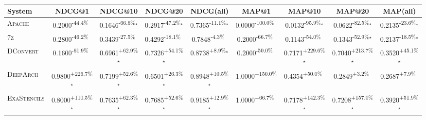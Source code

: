 \begin{table}[htbp]
\centering
\renewcommand{\arraystretch}{1.2}
\begin{tabular}{l|cccc|cccc}
\hline
System & NDCG@1 & NDCG@10 & NDCG@20 & NDCG(all) & MAP@1 & MAP@10 & MAP@20 & MAP(all) \\ \hline
\textsc{Apache} & \cellcolor{red!30}0.2000\textsuperscript{-44.4\%}$^{\,\,\,}$ & \cellcolor{red!30}0.1646\textsuperscript{-66.6\%}$^\star$ & \cellcolor{red!30}0.2917\textsuperscript{-47.2\%}$^\star$ & \cellcolor{red!30}0.7365\textsuperscript{-11.1\%}$^\star$ & \cellcolor{red!30}0.0000\textsuperscript{-100.0\%}$^{\,\,\,}$ & \cellcolor{red!30}0.0132\textsuperscript{-95.9\%}$^\star$ & \cellcolor{red!30}0.0622\textsuperscript{-82.5\%}$^\star$ & \cellcolor{red!30}0.2135\textsuperscript{-23.6\%}$^\star$ \\
\textsc{7z} & \cellcolor{red!30}0.2800\textsuperscript{-46.2\%}$^{\,\,\,}$ & \cellcolor{red!30}0.3439\textsuperscript{-27.5\%}$^{\,\,\,}$ & \cellcolor{red!30}0.4292\textsuperscript{-18.1\%}$^{\,\,\,}$ & \cellcolor{red!30}0.7848\textsuperscript{-4.3\%}$^{\,\,\,}$ & \cellcolor{red!30}0.2000\textsuperscript{-66.7\%}$^{\,\,\,}$ & \cellcolor{red!30}0.1143\textsuperscript{-54.0\%}$^{\,\,\,}$ & \cellcolor{red!30}0.1343\textsuperscript{-52.9\%}$^\star$ & \cellcolor{red!30}0.2137\textsuperscript{-18.5\%}$^\star$ \\
\textsc{DConvert} & \cellcolor{red!30}0.1600\textsuperscript{-61.9\%}$^{\,\,\,}$ & \cellcolor{green!30}0.6961\textsuperscript{+62.9\%}$^\star$ & \cellcolor{green!30}0.7326\textsuperscript{+54.1\%}$^\star$ & \cellcolor{green!30}0.8738\textsuperscript{+8.9\%}$^\star$ & \cellcolor{red!30}0.2000\textsuperscript{-50.0\%}$^{\,\,\,}$ & \cellcolor{green!30}0.7171\textsuperscript{+229.6\%}$^\star$ & \cellcolor{green!30}0.7040\textsuperscript{+213.7\%}$^\star$ & \cellcolor{green!30}0.3520\textsuperscript{+45.1\%}$^\star$ \\
\textsc{DeepArch} & \cellcolor{green!30}0.9800\textsuperscript{+226.7\%}$^\star$ & \cellcolor{green!30}0.7199\textsuperscript{+52.6\%}$^\star$ & \cellcolor{green!30}0.6501\textsuperscript{+26.3\%}$^\star$ & \cellcolor{green!30}0.8948\textsuperscript{+10.5\%}$^\star$ & \cellcolor{green!30}1.0000\textsuperscript{+150.0\%}$^{\,\,\,}$ & \cellcolor{green!30}0.4354\textsuperscript{+50.0\%}$^{\,\,\,}$ & \cellcolor{green!30}0.2849\textsuperscript{+3.2\%}$^{\,\,\,}$ & \cellcolor{green!30}0.2687\textsuperscript{+7.9\%}$^{\,\,\,}$ \\
\textsc{ExaStencils} & \cellcolor{green!30}0.8000\textsuperscript{+110.5\%}$^\star$ & \cellcolor{green!30}0.7635\textsuperscript{+62.3\%}$^\star$ & \cellcolor{green!30}0.7685\textsuperscript{+52.6\%}$^\star$ & \cellcolor{green!30}0.9185\textsuperscript{+12.9\%}$^\star$ & \cellcolor{green!30}1.0000\textsuperscript{+66.7\%}$^{\,\,\,}$ & \cellcolor{green!30}0.7178\textsuperscript{+142.3\%}$^\star$ & \cellcolor{green!30}0.7208\textsuperscript{+157.0\%}$^\star$ & \cellcolor{green!30}0.3920\textsuperscript{+51.9\%}$^\star$ \\

\end{tabular}
\end{table}
